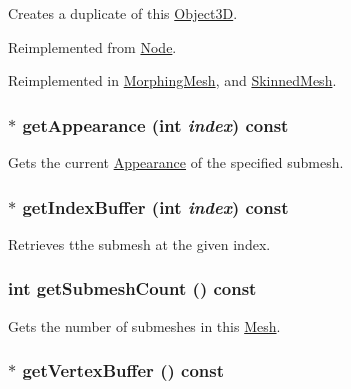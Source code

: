 Creates a duplicate of this \hyperlink{classm3g_1_1Object3D}{Object3D}. 

Reimplemented from \hyperlink{classm3g_1_1Node_0b9f7531a4b56d34f47aeb1fff0d37e0}{Node}.

Reimplemented in \hyperlink{classm3g_1_1MorphingMesh_7e7b2c3c4c988c6341a5e249bd468f57}{MorphingMesh}, and \hyperlink{classm3g_1_1SkinnedMesh_d3f422cf7656b73687d789094c7eae42}{SkinnedMesh}.\hypertarget{classm3g_1_1Mesh_4950a19e02c022dcf41a086117eb8219}{
\subsubsection[{getAppearance}]{ $\ast$ getAppearance (int {\em index}) const}}
\label{classm3g_1_1Mesh_4950a19e02c022dcf41a086117eb8219}


Gets the current \hyperlink{classm3g_1_1Appearance}{Appearance} of the specified submesh. \hypertarget{classm3g_1_1Mesh_ca34a663f46ce20e2b894c046714ea1d}{
\subsubsection[{getIndexBuffer}]{ $\ast$ getIndexBuffer (int {\em index}) const}}
\label{classm3g_1_1Mesh_ca34a663f46ce20e2b894c046714ea1d}


Retrieves tthe submesh at the given index. \hypertarget{classm3g_1_1Mesh_5dc5a57ad549eb97504c2a1280a882dd}{
\subsubsection[{getSubmeshCount}]{\setlength{\rightskip}{0pt plus 5cm}int getSubmeshCount () const}}
\label{classm3g_1_1Mesh_5dc5a57ad549eb97504c2a1280a882dd}


Gets the number of submeshes in this \hyperlink{classm3g_1_1Mesh}{Mesh}. \hypertarget{classm3g_1_1Mesh_7602e9bf450fa8b3ec3c60e2e88cba25}{
\subsubsection[{getVertexBuffer}]{ $\ast$ getVertexBuffer () const}}
\label{classm3g_1_1Mesh_7602e9bf450fa8b3ec3c60e2e88cba25}


